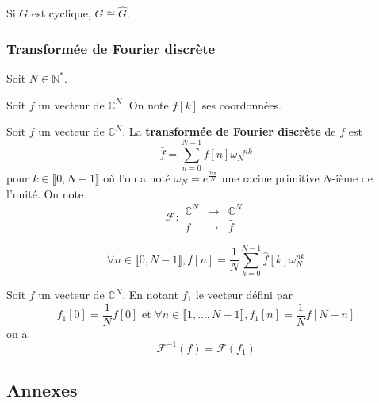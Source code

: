 	\begin{corollary}
		Si $G$ est cyclique, $G \cong \widehat{G}$.
	\end{corollary}

	\subsubsection{Transformée de Fourier discrète}


	Soit $N \in \mathbb{N}^*$.

	\begin{notation}
		Soit $f$ un vecteur de $\mathbb{C}^{N}$. On note $f[k]$ ses coordonnées.
	\end{notation}

	\begin{definition}
		Soit $f$ un vecteur de $\mathbb{C}^{N}$.
		La \textbf{transformée de Fourier discrète} de $f$ est
		\[ \widehat{f} = \sum_{n=0}^{N-1} f[n] \omega_N^{-nk} \]
		pour $k \in \llbracket 0, N-1 \rrbracket$ où l'on a noté $\omega_N = e^{\frac{2i\pi}{N}}$ une racine primitive $N$-ième de l'unité.
		On note
		\[
		\mathcal{F} :
		\begin{array}{ccc}
			\mathbb{C}^{N} &\rightarrow& \mathbb{C}^{N} \\
			f &\mapsto& \widehat{f}
		\end{array}
		\]
	\end{definition}

	\begin{proposition}
		\[ \forall n \in \llbracket 0, N-1 \rrbracket, f[n] = \frac{1}{N} \sum_{k=0}^{N-1} \widehat{f}[k] \omega_N^{nk} \]
	\end{proposition}

	\begin{corollary}
		Soit $f$ un vecteur de $\mathbb{C}^{N}$. En notant $f_1$ le vecteur défini par
		\[ f_1[0] = \frac{1}{N} f[0] \text{ et } \forall n \in \llbracket 1, \dots, N-1 \rrbracket, f_1[n] = \frac{1}{N} f[N-n] \]
		on a
		\[ \mathcal{F}^{-1}(f) = \mathcal{F}(f_1) \]
	\end{corollary}

	\newpage
	\subsection*{Annexes}


